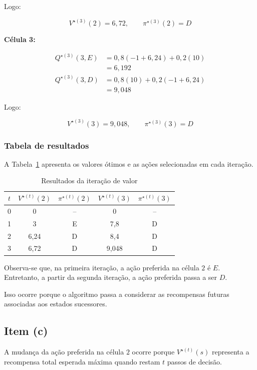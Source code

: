 Logo:

\[
V^{\star(3)}(2)=6{,}72,
\qquad \pi^{\star(3)}(2)=D
\]

\textbf{Célula 3:}

\[
\begin{aligned}
Q^{\star(3)}(3,E)
&=0{,}8(-1+6{,}24)+0{,}2(10)\\
&=6{,}192
\\[6pt]
Q^{\star(3)}(3,D)
&=0{,}8(10)+0{,}2(-1+6{,}24)\\
&=9{,}048
\end{aligned}
\]

Logo:

\[
V^{\star(3)}(3)=9{,}048,
\qquad \pi^{\star(3)}(3)=D
\]

\subsubsection*{Tabela de resultados}

A Tabela~\ref{tab:iteracao_valor_rover}
apresenta os valores ótimos e as ações
selecionadas em cada iteração.

\begin{table}[H]
\centering
\caption{Resultados da iteração de valor}
\label{tab:iteracao_valor_rover}
\begin{tabular}{ccccc}
\toprule
$t$ & $V^{\star(t)}(2)$ & $\pi^{\star(t)}(2)$
& $V^{\star(t)}(3)$ & $\pi^{\star(t)}(3)$\\
\midrule
0 & 0 & -- & 0 & --\\
1 & 3 & E & 7,8 & D\\
2 & 6,24 & D & 8,4 & D\\
3 & 6,72 & D & 9,048 & D\\
\bottomrule
\end{tabular}
\end{table}

Observa-se que, na primeira iteração,
a ação preferida na célula $2$ é $E$.
Entretanto, a partir da segunda iteração,
a ação preferida passa a ser $D$.

Isso ocorre porque o algoritmo passa a
considerar as recompensas futuras
associadas aos estados sucessores.


\subsection{Item (c)}

A mudança da ação preferida na célula $2$
ocorre porque $V^{\star(t)}(s)$ representa
a recompensa total esperada máxima quando
restam $t$ passos de decisão.

